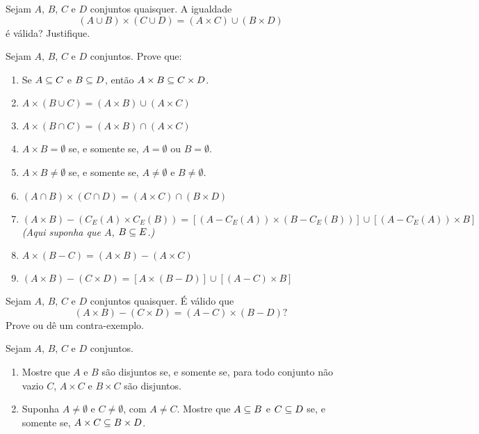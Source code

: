 \documentclass[12pt]{exam}
\begin{document}
    \vspace{.3cm}

    \questao{} Sejam $A$, $B$, $C$ e $D$ conjuntos quaisquer. A igualdade
    \[
        (A \cup B) \times (C \cup D) = (A \times C) \cup (B \times D)
    \]
    é válida? Justifique.

    \vspace{.3cm}

    \questao{} Sejam $A$, $B$, $C$ e $D$ conjuntos. Prove que:
    \begin{enumerate}[label={\alph*})]
        \item Se $A \subseteq C$ e $B \subseteq D$, então $A \times B \subseteq C \times D$.

        \item $A \times (B \cup C) = (A \times B) \cup (A \times C)$

        \item $A \times (B \cap C) = (A \times B) \cap (A \times C)$

        \item $A \times B = \emptyset$ se, e somente se, $A = \emptyset$ ou $B = \emptyset$.

        \item $A \times B \ne \emptyset$ se, e somente se, $A \ne \emptyset$ e $B \ne \emptyset$.

        \item $(A \cap B) \times (C \cap D) = (A \times C) \cap (B \times D)$

        \item $(A \times B) - (C_E(A) \times C_E(B)) = [(A - C_E(A)) \times (B - C_E(B))] \cup [(A - C_E(A)) \times B]$  \textit{(Aqui suponha que $A$, $B \subseteq E$.)}

        \item $A \times (B - C) = (A \times B) - (A \times C)$

        \item $(A \times B) - (C \times D) = [A \times (B - D)] \cup [(A - C) \times B]$
    \end{enumerate}

    \vspace{.3cm}

    \questao{} Sejam $A$, $B$, $C$ e $D$ conjuntos quaisquer. É válido que
    \[
        (A \times B) - (C \times D) = (A - C) \times (B - D)?
    \]
    Prove ou dê um contra-exemplo.

    \vspace{.3cm}

    \questao{} Sejam $A$, $B$, $C$ e $D$ conjuntos.
    \begin{enumerate}[label={\alph*})]
        \item Mostre que $A$ e $B$ são disjuntos se, e somente se, para todo conjunto não vazio $C$, $A \times C$ e $B \times C$ são disjuntos.

        \item Suponha $A \ne \emptyset$ e $C \ne \emptyset$, com $A \ne C$. Mostre que $A \subseteq B$ e $C \subseteq D$ se, e somente se, $A \times C \subseteq B \times D$.
    \end{enumerate}
\end{document}

